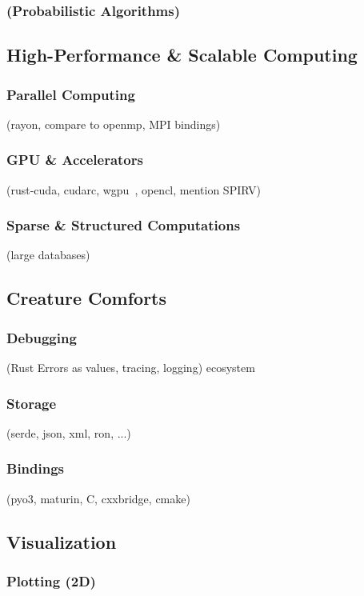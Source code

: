 \documentclass{article}
\begin{document}
\subsubsection{(Probabilistic Algorithms)}

\subsection{High-Performance \& Scalable Computing}
\subsubsection{Parallel Computing}
(rayon, compare to openmp, MPI bindings)

\subsubsection{GPU \& Accelerators}
(rust-cuda, cudarc, wgpu~\cite{Fitzgerald2025}, opencl, mention SPIRV)

\subsubsection{Sparse \& Structured Computations}
(large databases)

\subsection{Creature Comforts}
\subsubsection{Debugging}
(Rust Errors as values, tracing, logging) ecosystem

\subsubsection{Storage}
(serde, json, xml, ron, ...)

\subsubsection{Bindings}
(pyo3, maturin, C, cxxbridge, cmake)

\subsection{Visualization}
\subsubsection{Plotting (2D)}
\end{document}
